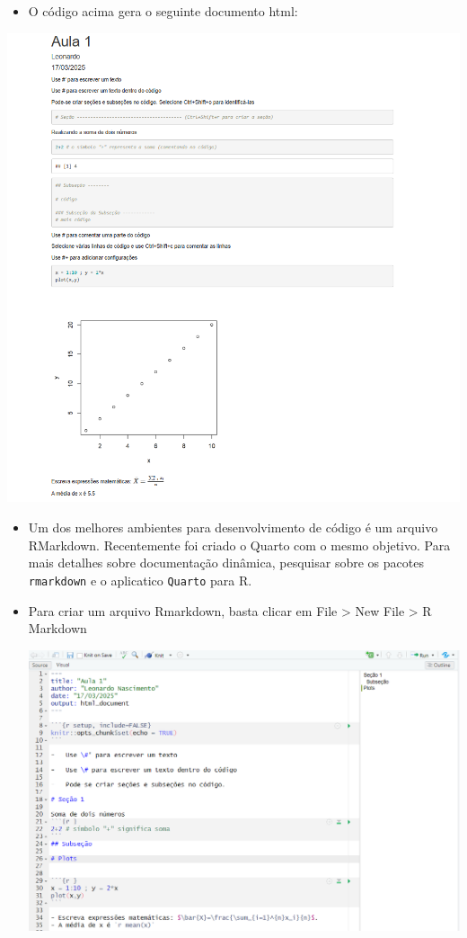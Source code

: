 \documentclass[
  letterpaper,
  DIV=11,
  numbers=noendperiod]{scrartcl}
\providecommand{\tightlist}{%
  \setlength{\itemsep}{0pt}\setlength{\parskip}{0pt}}\usepackage{longtable,booktabs,array}
\begin{document}
\begin{itemize}
\tightlist
\item
  O código acima gera o seguinte documento html:
\end{itemize}

\begin{center}
\includegraphics{Figuras/doc.png}
\end{center}

\begin{itemize}
\item
  Um dos melhores ambientes para desenvolvimento de código é um arquivo
  RMarkdown. Recentemente foi criado o Quarto com o mesmo objetivo. Para
  mais detalhes sobre documentação dinâmica, pesquisar sobre os pacotes
  \texttt{rmarkdown} e o aplicatico \texttt{Quarto} para R.\\
\item
  Para criar um arquivo Rmarkdown, basta clicar em File \textgreater{}
  New File \textgreater{} R Markdown

  \includegraphics[width=6.125in,height=\textheight]{Figuras/rmd.png}
\end{itemize}
\end{document}
